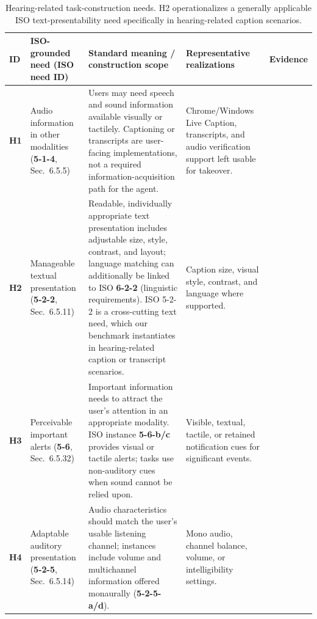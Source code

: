 \documentclass[11pt]{article}
\begin{document}
\begin{table}[t]
\centering
\scriptsize
\begin{tabularx}{\textwidth}{>{\bfseries}p{} p{} p{} X p{}}
\toprule
ID & ISO-grounded need (ISO need ID) & Standard meaning / construction scope & Representative realizations & Evidence \tabularnewline
\midrule
H1 & Audio information in other modalities (\textbf{5-1-4}, Sec.~6.5.5) & Users may need speech and sound information available visually or tactilely. Captioning or transcripts are user-facing implementations, not a required information-acquisition path for the agent. & Chrome/Windows Live Caption, transcripts, and audio verification support left usable for takeover. & \citep{iso29138,w3cmedia,afbcaptions,w3cauditory} \tabularnewline
H2 & Manageable textual presentation (\textbf{5-2-2}, Sec.~6.5.11) & Readable, individually appropriate text presentation includes adjustable size, style, contrast, and layout; language matching can additionally be linked to ISO \textbf{6-2-2} (linguistic requirements). ISO 5-2-2 is a cross-cutting text need, which our benchmark instantiates in hearing-related caption or transcript scenarios. & Caption size, visual style, contrast, and language where supported. & \citep{iso29138,mshearing,acmacaptions,w3cauditory} \tabularnewline
H3 & Perceivable important alerts (\textbf{5-6}, Sec.~6.5.32) & Important information needs to attract the user's attention in an appropriate modality. ISO instance \textbf{5-6-b/c} provides visual or tactile alerts; tasks use non-auditory cues when sound cannot be relied upon. & Visible, textual, tactile, or retained notification cues for significant events. & \citep{iso29138,mshearing,w3cauditory} \tabularnewline
H4 & Adaptable auditory presentation (\textbf{5-2-5}, Sec.~6.5.14) & Audio characteristics should match the user's usable listening channel; instances include volume and multichannel information offered monaurally (\textbf{5-2-5-a/d}). & Mono audio, channel balance, volume, or intelligibility settings. & \citep{iso29138,mshearing} \tabularnewline
\bottomrule
\end{tabularx}
\caption{Hearing-related task-construction needs. H2 operationalizes a generally applicable ISO text-presentability need specifically in hearing-related caption scenarios.}
\label{tab:hearing_needs}
\end{table}
\end{document}
